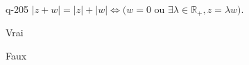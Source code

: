 \begin{truefalse}{q-205}
$|z+w|= |z|+|w| \iff (w=0$ ou $\exists \lambda \in \mathbb R_{+}, z=\lambda w)$.
\item* Vrai
\item Faux
\end{truefalse}


